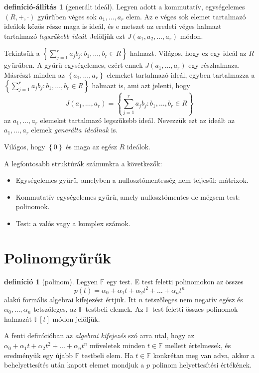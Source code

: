 \documentclass[a4paper, showtrims]{memoir}
\theoremstyle{plain}
\theoremstyle{remark}
\theoremstyle{definition}
\newtheorem{definition}[proposition]{definíció}
\newtheorem{defprop}[proposition]{definíció-állítás}
\begin{document}
\begin{defprop}[generált ideál]
	Legyen adott a  kommutatív, egységelemes $\left( R,+,\cdot \right)$ gyűrűben véges sok $a_1,\ldots,a_r$ elem.
	Az e véges sok elemet tartalmazó ideálok közös része maga is ideál,
	és e metszet az eredeti véges halmazt
	tartalmazó \emph{legszűkebb ideál}.
	Jelöljük ezt $J\left( a_1,a_2,\ldots,a_r \right)$ módon.

	Tekintsük a
	$
		\left\{ \sum_{j=1}^ra_jb_j:b_1,\ldots,b_r\in R \right\}
	$
	halmazt.
	Világos,
	hogy ez egy ideál az $R$ gyűrűben.
	A gyűrű egységelemes,
	ezért ennek $J\left( a_1,\ldots,a_r \right)$ egy részhalmaza.
	Másrészt minden az $\left\{ a_1,\ldots,a_r \right\}$ elemeket tartalmazó ideál,
	egyben tartalmazza a
	$
		\left\{ \sum_{j=1}^ra_jb_j:b_1,\ldots,b_r\in R \right\}
	$
	halmazt is,
	ami azt jelenti, hogy
	\[
		J\left( a_1,\ldots,a_r \right)=
		\left\{ \sum_{j=1}^ra_jb_j:b_1,\ldots,b_r\in R \right\}
	\]
	az $a_1,\ldots,a_r$ elemeket tartalmazó legszűkebb ideál.
	Nevezzük ezt az ideált az $a_1,\ldots,a_r$ elemek \emph{generálta ideálnak} is.
\end{defprop}



Világos, hogy $\left\{ 0 \right\}$ és maga az egész $R$ ideálok.

A legfontosabb struktúrák számunkra a következők:
\begin{itemize}
	\item
	      Egységelemes gyűrű, amelyben a nullosztómentesség nem teljesül: mátrixok.
	\item
	      Kommutatív egységelemes gyűrű, amely nullosztómentes de mégsem test: polinomok.
	\item
	      Test:
	      a valós vagy a komplex számok.
\end{itemize}
\section{Polinomgyűrűk}
\begin{definition}[polinom]
	Legyen $\mathbb{F}$ egy test.
	E test feletti polinomokon az összes
	\[
		p\left( t \right)=
		\alpha_0+\alpha_1t+\alpha_2t^2+\ldots+\alpha_nt^n
	\]
	alakú formális algebrai kifejezést értjük.
	Itt $n$ tetszőleges nem negatív egész
	és $\alpha_0,\ldots,\alpha_n$ tetszőleges, az $\mathbb{F}$ testbeli elemek.
	Az $\mathbb{F}$ test feletti összes polinomok halmazát $\mathbb{F}\left[ t \right]$ módon jelöljük.
\end{definition}
A fenti definícióban az \emph{algebrai kifejezés} szó arra utal,  hogy az
\begin{math}
	\alpha_0+\alpha_1t+\alpha_2t^2+\ldots+\alpha_nt^n
\end{math}
műveletek minden $t\in\mathbb{F}$ mellett értelmesek,
és eredményük egy újabb $\mathbb{F}$ testbeli elem.
Ha $t\in\mathbb{F}$ konkrétan meg van adva,
akkor a behelyettesítés után kapott elemet mondjuk a $p$ polinom helyettesítési értékének.
\end{document}
